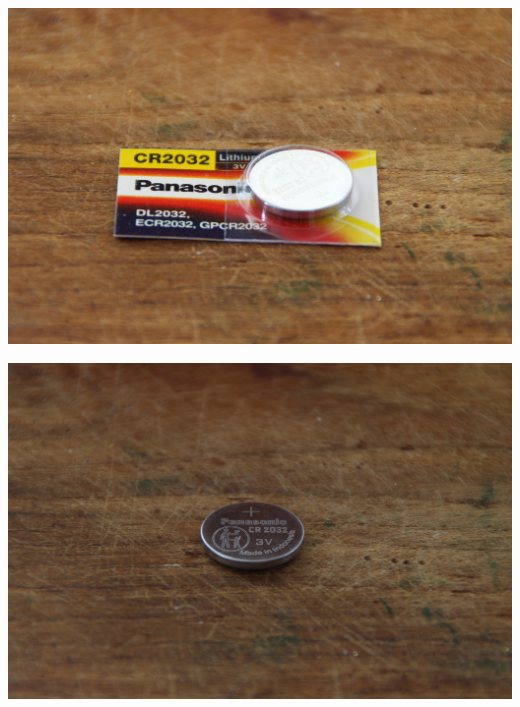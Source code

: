 \documentclass{article}
\begin{document}
\begin{minipage}[b]{0.5\textwidth}
	\includegraphics[width=\textwidth]{Bilder2023/IMG_8386.JPG}
\end{minipage}
\begin{minipage}[b]{0.5\textwidth}
	\includegraphics[width=\textwidth]{Bilder2023/IMG_8387.JPG}
\end{minipage}

\vspace{0.5cm}
\end{document}
